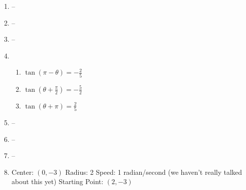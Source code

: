 \documentclass{article}
\begin{document}
\begin{enumerate}
\begin{tabular}{| c | c | c |}
	\end{tabular}
	
\item --

\item -- 

\item --

\item
	
	\begin{enumerate}
	
	\item $\tan{(\pi - \theta)} = -\frac{2}{5}$
	
	\item $\tan{(\theta + \frac{\pi}{2})} = -\frac{5}{2}$
	
	\item $\tan{(\theta + \pi)} = \frac{2}{5}$
	
	\end{enumerate}
	
\item --

\item --

\item --

\item Center: $(0, -3)$ \newline
	Radius: 2 \newline
	Speed: 1 radian/second (we haven't really talked about this yet) \newline
	Starting Point: $(2, -3)$

\end{enumerate}
\end{document}

